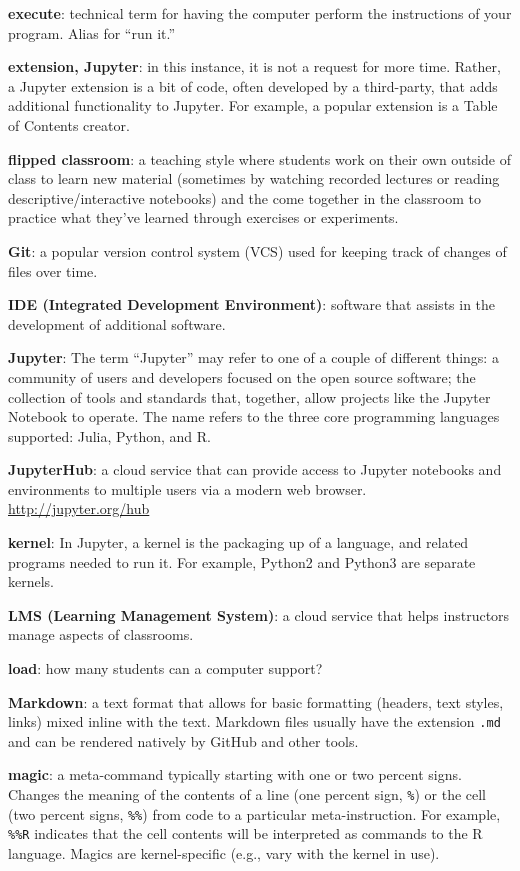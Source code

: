 \documentclass[]{book}
\begin{document}
\textbf{execute}: technical term for having the computer perform the
instructions of your program. Alias for ``run it.''

\textbf{extension, Jupyter}: in this instance, it is not a request for
more time. Rather, a Jupyter extension is a bit of code, often developed
by a third-party, that adds additional functionality to Jupyter. For
example, a popular extension is a Table of Contents creator.

\textbf{flipped classroom}: a teaching style where students work on
their own outside of class to learn new material (sometimes by watching
recorded lectures or reading descriptive/interactive notebooks) and the
come together in the classroom to practice what they've learned through
exercises or experiments.

\textbf{Git}: a popular version control system (VCS) used for keeping
track of changes of files over time.

\textbf{IDE (Integrated Development Environment)}: software that assists
in the development of additional software.

\textbf{Jupyter}: The term ``Jupyter'' may refer to one of a couple of
different things: a community of users and developers focused on the
open source software; the collection of tools and standards that,
together, allow projects like the Jupyter Notebook to operate. The name
refers to the three core programming languages supported: Julia, Python,
and R.

\textbf{JupyterHub}: a cloud service that can provide access to Jupyter
notebooks and environments to multiple users via a modern web browser.
\url{http://jupyter.org/hub}

\textbf{kernel}: In Jupyter, a kernel is the packaging up of a language,
and related programs needed to run it. For example, Python2 and Python3
are separate kernels.

\textbf{LMS (Learning Management System)}: a cloud service that helps
instructors manage aspects of classrooms.

\textbf{load}: how many students can a computer support?

\textbf{Markdown}: a text format that allows for basic formatting
(headers, text styles, links) mixed inline with the text. Markdown files
usually have the extension \texttt{.md} and can be rendered natively by
GitHub and other tools.

\textbf{magic}: a meta-command typically starting with one or two
percent signs. Changes the meaning of the contents of a line (one
percent sign, \texttt{\%}) or the cell (two percent signs,
\texttt{\%\%}) from code to a particular meta-instruction. For example,
\texttt{\%\%R} indicates that the cell contents will be interpreted as
commands to the R language. Magics are kernel-specific (e.g., vary with
the kernel in use).
\end{document}
